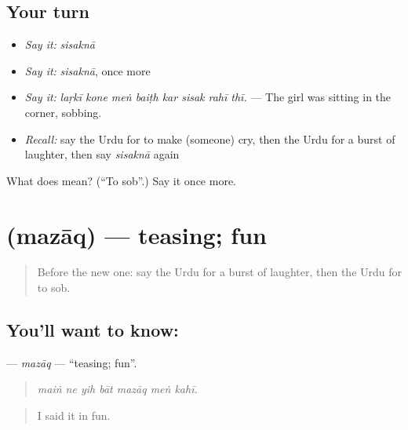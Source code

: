 \subsection*{Your turn}
\begin{itemize}
\raggedright
  \item \emph{Say it:} \emph{sisaknā}
  \item \emph{Say it:} \emph{sisaknā}, once more
  \item \emph{Say it:} \emph{laṛkī kone meṅ baiṭh kar sisak rahī thī.} — The girl was sitting in the corner, sobbing.
  \item \emph{Recall:} say the Urdu for to make (someone) cry, then the Urdu for a burst of laughter, then say \emph{sisaknā} again
\end{itemize}

\begin{tcolorbox}[breakable,colback=teal!4,colframe=teal!35!black,title={Before you move on}]
What does  mean? (\textquotedblleft{}To sob\textquotedblright{}.) Say it once more.
\end{tcolorbox}
\section[\texorpdfstring{\ur{مذاق} (mazāq)}{مذاق (mazāq)}]{ (mazāq) — teasing; fun}

\label{lesson:UR-C453-mazaq}



\begin{quote}
Before the new one: say the Urdu for a burst of laughter, then the Urdu for to sob.
\end{quote}

\subsection*{You'll want to know: }
\textbf{} — \emph{mazāq} — \textquotedblleft{}teasing; fun\textquotedblright{}.

\begin{quote}
      
\end{quote}

\begin{quote}
\emph{maiṅ ne yih bāt mazāq meṅ kahī.}
\end{quote}

\begin{quote}
I said it in fun.
\end{quote}

